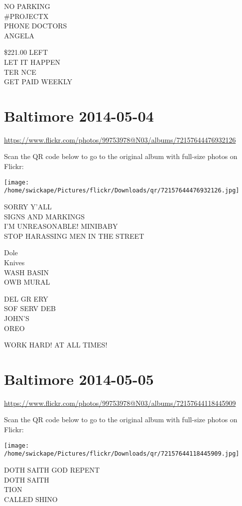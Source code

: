 \documentclass[10pt,letterpaper]{article}
\begin{document}
NO PARKING\\
\#PROJECTX\\
PHONE DOCTORS\\
ANGELA

\$221.00 LEFT\\
LET IT HAPPEN\\
TER NCE\\
GET PAID WEEKLY


\section*{Baltimore 2014-05-04}

\url{https://www.flickr.com/photos/99753978@N03/albums/72157644476932126}

Scan the QR code below to go to the original album with full-size photos on Flickr:

\texttt{[image: /home/swickape/Pictures/flickr/Downloads/qr/72157644476932126.jpg]}


SORRY Y'ALL\\
SIGNS AND MARKINGS\\
I'M UNREASONABLE! MINIBABY\\
STOP HARASSING MEN IN THE STREET

Dole\\
Knives\\
WASH BASIN\\
OWB MURAL

DEL GR ERY\\
SOF SERV DEB\\
JOHN'S\\
OREO

WORK HARD!  AT ALL TIMES!


\section*{Baltimore 2014-05-05}

\url{https://www.flickr.com/photos/99753978@N03/albums/72157644118445909}

Scan the QR code below to go to the original album with full-size photos on Flickr:

\texttt{[image: /home/swickape/Pictures/flickr/Downloads/qr/72157644118445909.jpg]}


DOTH SAITH GOD REPENT\\
DOTH SAITH\\
TION\\
CALLED SHINO
\end{document}
